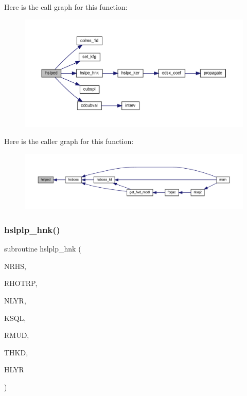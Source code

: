 Here is the call graph for this function\+:\nopagebreak
\begin{figure}[H]
\begin{center}
\leavevmode
\includegraphics[width=350pt]{Leroi_8f90_a1965f18ad74a78ddcda474fa4268445f_cgraph}
\end{center}
\end{figure}
Here is the caller graph for this function\+:\nopagebreak
\begin{figure}[H]
\begin{center}
\leavevmode
\includegraphics[width=350pt]{Leroi_8f90_a1965f18ad74a78ddcda474fa4268445f_icgraph}
\end{center}
\end{figure}
\mbox{\label{Leroi_8f90_a9418379c5cb3a81d71a2a66746f839da}} 
\subsubsection{\texorpdfstring{hslplp\+\_\+hnk()}{hslplp\_hnk()}}
{\footnotesize\ttfamily subroutine hslplp\+\_\+hnk (\begin{DoxyParamCaption}\item[{integer}]{N\+R\+HS,  }\item[{real, dimension(nrhs)}]{R\+H\+O\+T\+RP,  }\item[{integer}]{N\+L\+YR,  }\item[{complex(kind=ql), dimension(nlyr)}]{K\+S\+QL,  }\item[{real(kind=ql), dimension(0\+:nlyr)}]{R\+M\+UD,  }\item[{real(kind=ql), dimension(nlyr)}]{T\+H\+KD,  }\item[{complex, dimension(nrhs)}]{H\+L\+YR }\end{DoxyParamCaption})}

